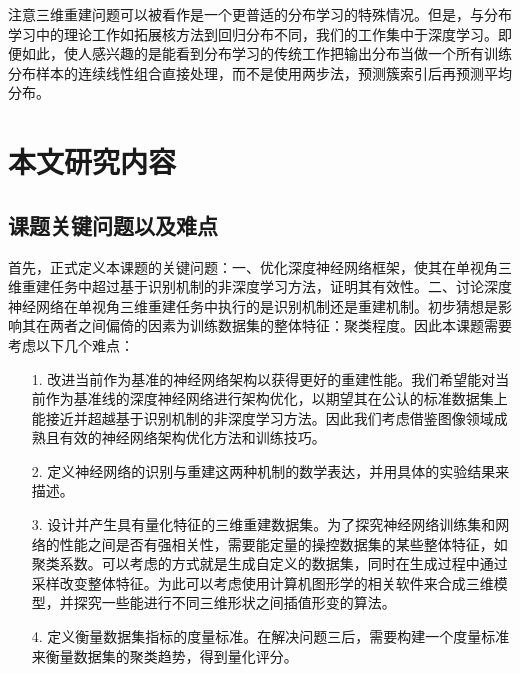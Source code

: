 \documentclass[bachelor, nocolorlinks, printoneside]{seuthesis} %
\begin{document}
\begin{Main}
注意三维重建问题可以被看作是一个更普适的分布学习\cite{oliva2013distribution,poczos2013distribution}的特殊情况。但是，与分布学习中的理论工作如拓展核方法到回归分布不同，我们的工作集中于深度学习。即便如此，使人感兴趣的是能看到分布学习的传统工作把输出分布当做一个所有训练分布样本的连续线性组合直接处理，而不是使用两步法，预测簇索引后再预测平均分布。
\section{本文研究内容}
\subsection{课题关键问题以及难点}
首先，正式定义本课题的关键问题：一、优化深度神经网络框架，使其在单视角三维重建任务中超过基于识别机制的非深度学习方法，证明其有效性。二、讨论深度神经网络在单视角三维重建任务中执行的是识别机制还是重建机制。初步猜想是影响其在两者之间偏倚的因素为训练数据集的整体特征：聚类程度。因此本课题需要考虑以下几个难点：
\begin{enumerate}
    \item[1.]改进当前作为基准的神经网络架构以获得更好的重建性能。我们希望能对当前作为基准线的深度神经网络进行架构优化，以期望其在公认的标准数据集上能接近并超越基于识别机制的非深度学习方法。因此我们考虑借鉴图像领域成熟且有效的神经网络架构优化方法和训练技巧。
    \item[2.]定义神经网络的识别与重建这两种机制的数学表达，并用具体的实验结果来描述。
    \item[3.]设计并产生具有量化特征的三维重建数据集。为了探究神经网络训练集和网络的性能之间是否有强相关性，需要能定量的操控数据集的某些整体特征，如聚类系数。可以考虑的方式就是生成自定义的数据集，同时在生成过程中通过采样改变整体特征。为此可以考虑使用计算机图形学的相关软件来合成三维模型，并探究一些能进行不同三维形状之间插值形变的算法。
    \item[4.]定义衡量数据集指标的度量标准。在解决问题三后，需要构建一个度量标准来衡量数据集的聚类趋势，得到量化评分。   
\end{enumerate}


\end{Main}
\end{document}
